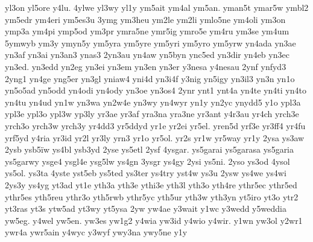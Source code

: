 {yl3on
yl5ore
y4lu.
4ylwe
yl3wy
yl1y
ym5ait
ym4al
ym5an.
yman5t
ymar5w
ymbl2
ym5edr
ym4eri
ym5es3u
3ymg
ym3heu
ym2le
ym2li
ymlo5ne
ym4oli
ym3on
ymp3a
ym4pi
ymp5od
ym3pr
ymra5ne
ymr5ig
ymro5e
ym4ru
ym3se
ym4um
5ymwyb
ym3y
ymyn5y
ym5yra
ym5yre
ym5yri
ym5yro
ym5yrw
yn4ada
yn3ae
yn3af
yn3ai
yn3an3
ynas3
2yn3au
yn4aw
yn5byn
ync5ed
yn3dir
yn4eb
yn3ec
yn3ed.
yn3edd
yn2eg
yn3ei
yn3em
yn3en
yn3er
y3nesa
y4nesau
2ynf
ynfyd3
2yng1
yn4ge
yng5er
yn3gl
yniaw4
yni4d
yn3i4f
y3nig
yn5igy
yn3il3
yn3n
yn1o
yn5o5ad
yn5odd
yn4odi
yn4ody
yn3oe
yn3os4
2ynr
ynt1
ynt4a
yn4te
yn4ti
yn4to
yn4tu
yn4ud
yn1w
yn3wa
yn2w4e
yn3wy
yn4wyr
yn1y
yn2yc
ynydd5
y1o
ypl3a
ypl3e
ypl3o
ypl3w
yp3ly
yr3ae
yr3af
yra3na
yra3ne
yr3ant
y4r3au
yr4ch
yrch3e
yrch3o
yrch3w
yrch3y
yr4dd3
yr5ddyd
yr1e
yr2ei
yr5el.
yren5d
yrf3e
yr3ff4
yr4fu
yrf5yd
y4ria
yr3id
yr2l
yr3ly
yrn3
yr1o
yr5ol.
yr2s
yr1w
yr5way
yr1y
2ysa
ys3aw
2ysb
ysb5ïw
ys4bl
ysb3yd
2yse
ys5etl
2ysf
4ysgar.
ys5garai
ys5garasa
ys5garia
ys5garwy
ysge4
ysgl4e
ysg5lw
ys4gn
3ysgr
ys4gy
2ysi
ys5ni.
2yso
ys3od
4ysol
ys5ol.
ys3ta
4yste
yst5eb
ys5ted
ys3ter
ys4try
yst4w
ys3u
2ysw
ys4we
ys4wi
2ys3y
ys4yg
yt3ad
yt1e
yth3a
yth3e
ythi3e
yth3l
yth3o
yth4re
ythr5ec
ythr5ed
ythr5es
yth5reu
ythr3o
yth5rwb
ythr5yc
yth5ur
yth3w
yth3yn
yt5iro
yt3o
ytr2
yt3ras
yt3s
ytw5ad
yt3wy
yt5ysa
2yw
yw4ae
y3wait
y1wc
y3wedd
y5weddia
yw5eg.
y4wel
yw5en.
yw3es
yw1g2
y4wia
yw3id
y4wio
y4wir.
y1wn
yw3ol
y2wr1
ywr4a
ywr5ain
y4wyc
y3wyf
ywy3na
ywy5ne
y1y
}

